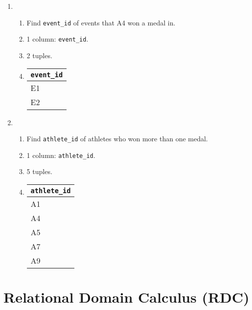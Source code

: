 \documentclass{homework}
\begin{document}
\begin{enumerate}
    \item
    \begin{enumerate}
        \item Find \texttt{event\_id} of events that A4 won a medal in.
        \item 1 column: \texttt{event\_id}.
        \item 2 tuples.
        \item 
        \begin{tabular}{@{}l@{}}
            \toprule
            \texttt{event\_id} \\ \midrule
            E1          \\
            E2          \\ \bottomrule
        \end{tabular}
    \end{enumerate}

    \item \begin{enumerate}
        \item Find \texttt{athlete\_id} of athletes who won more than one medal.
        \item 1 column: \texttt{athlete\_id}.
        \item 5 tuples.
        \item
        \begin{tabular}{@{}l@{}}
            \toprule
            \texttt{athlete\_id} \\ \midrule
            A1          \\
            A4          \\
            A5          \\
            A7          \\
            A9          \\ \bottomrule
        \end{tabular}
    \end{enumerate}
\end{enumerate}

\section{Relational Domain Calculus (RDC)}
\end{document}
